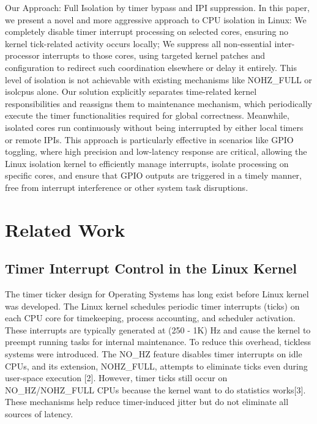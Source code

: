 \documentclass[letterpaper]{article}
\begin{document}
Our Approach: Full Isolation by timer bypass and IPI suppression. In this paper, we present a novel
and more aggressive approach to CPU isolation in Linux: We completely disable timer interrupt
processing on selected cores, ensuring no kernel tick-related activity occurs locally; We suppress
all non-essential inter-processor interrupts to those cores, using targeted kernel patches and
configuration to redirect such coordination elsewhere or delay it entirely. This level of isolation is
not achievable with existing mechanisms like NOHZ\_FULL or isolcpus alone. Our solution explicitly
separates time-related kernel responsibilities and reassigns them to maintenance mechanism,
which periodically execute the timer functionalities required for global correctness. Meanwhile,
isolated cores run continuously without being interrupted by either local timers or remote IPIs.
This approach is particularly effective in scenarios like GPIO toggling, where high precision and
low-latency response are critical, allowing the Linux isolation kernel to efficiently manage interrupts,
isolate processing on specific cores, and ensure that GPIO outputs are triggered in a timely manner,
free from interrupt interference or other system task disruptions.


\section{Related Work}\label{BG} 
\subsection{Timer Interrupt Control in the Linux Kernel}
The timer ticker design for Operating Systems has long exist before Linux kernel was
developed\cite{Corbet}.
The Linux kernel schedules periodic timer interrupts (ticks) on each CPU core for timekeeping,
process accounting, and scheduler activation. These interrupts are typically generated at (250 - 1K) Hz
and cause the kernel to preempt running tasks for internal maintenance.
To reduce this overhead, tickless systems were introduced. The NO\_HZ feature disables timer
interrupts on idle CPUs, and its extension, NOHZ\_FULL, attempts to eliminate ticks even during
user-space execution [2]. However, timer ticks still occur on NO\_HZ/NOHZ\_FULL CPUs because the
kernel want to do statistics works[3].
These mechanisms help reduce timer-induced jitter but do not eliminate all sources of latency.
\end{document}
